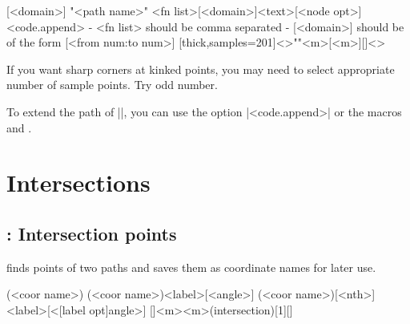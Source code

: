\begin{tzdef}
[<domain>]
"<path name>"
     {<fn list>}[<domain>]{<text>}[<node opt>]<code.append>
  - {<fn list>} should be comma separated
  - [<domain>] should be of the form [<from num:to num>]
  [thick,samples=201]<>""{<m>}[<m>]{}[]<>
\end{tzdef}


\begin{tzcode}{.3}
\end{tzcode}

\remark If you want sharp corners at kinked points, you may need to select appropriate number of sample points. Try odd number.

To extend the path of |\tzfnmin|, you can use the option |<code.append>| or the macros \icmd{\tzfnminAtBegin} and \icmd{\tzfnminAtEnd}.






\chapter{Intersections}
\label{c:intersections}

\section{\protect\cmd{\tzXpoint(*)}: Intersection points}
\label{s:intersections}

\icmd{\tzXpoint} finds  points of two paths and saves them as coordinate names for later use.

\begin{tzdef}
(<coor name>)
(<coor name>){<label>}[<angle>]
(<coor name>)[<nth>]{<label>}[<[label opt]angle>]
  []{<m>}{<m>}(intersection)[1]{}[]
\end{tzdef}

